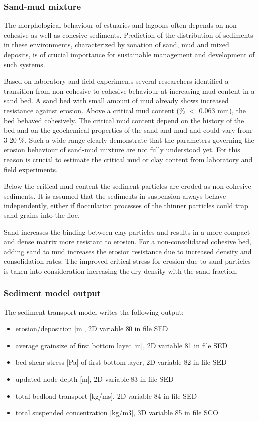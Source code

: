 \subsubsection{Sand-mud mixture}
The morphological behaviour of estuaries and lagoons often depends on
non-cohesive as well as cohesive sediments. Prediction of the distribution
of sediments in these environments, characterized by zonation of sand,
mud and mixed deposits, is of crucial importance for sustainable
management and development of such systems.

Based on laboratory and field experiments several researchers identified a
transition from non-cohesive to cohesive behaviour at increasing mud content
in a sand bed. A sand bed with small amount of mud already shows increased
resistance against erosion. Above a critical mud content (\% $<$ 0.063 mm), 
the bed behaved cohesively. The critical mud content depend on the history 
of the bed and on the geochemical properties of the sand and mud and could 
vary from 3-20 \%. Such a wide range clearly demonstrate that the 
parameters governing the erosion behaviour of sand-mud mixture are
 not fully understood yet. For this reason is crucial to estimate 
the critical mud or clay content from laboratory and field experiments.

Below the critical mud content the sediment particles are eroded as
non-cohesive sediments. It is assumed that the sediments in suspension
always behave independently, either if flocculation processes of the
thinner particles could trap sand grains into the floc.

Sand increases the binding between clay particles and results
in a more compact and dense matrix more resistant to erosion. For
a non-consolidated cohesive bed, adding sand to mud increases the erosion
resistance due to increased density and consolidation rates.
The improved critical stress for erosion due to sand particles is taken
into consideration increasing the dry density with the sand fraction.

\subsubsection{Sediment model output}
The sediment transport model writes the following output:
\begin{itemize}
\item erosion/deposition [m], 2D variable 80 in file SED
\item average grainsize of first bottom layer [m], 2D variable 81 in file SED 
\item bed shear stress [Pa] of first bottom layer, 2D variable 82 in file SED
\item updated node depth [m], 2D variable 83 in file SED
\item total bedload transport [kg/ms], 2D variable 84 in file SED
\item total suspended concentration [kg/m3], 3D variable 85 in file SCO
\end{itemize}

